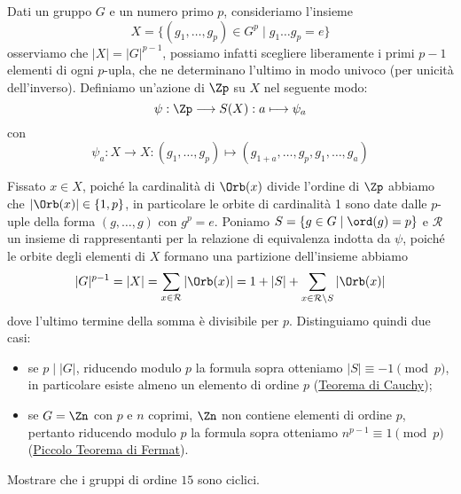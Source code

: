 \documentclass[11pt]{scrartcl}
\begin{document}
Dati un gruppo $G$ e un numero primo $p$, consideriamo l'insieme 
\[
    X = \{(g_1, \ldots, g_p) \in G^p\mid g_1\ldots g_p = e\}
\]osserviamo che $|X| = |G|^{p - 1}$, possiamo infatti scegliere liberamente
i primi $p - 1$ elementi di ogni $p$-upla, che ne determinano l'ultimo in 
modo univoco (per unicità dell'inverso). Definiamo un'azione di $\Zp$ su $X$
nel seguente modo:
\[
    \psi: \Zp \longrightarrow S(X) : a \longmapsto \psi_a
\]
con
\[
    \psi_a:X\longrightarrow X : (g_1, \ldots, g_p)\longmapsto (g_{1 + a}, \ldots, g_p, g_1, \ldots, g_a)
\]

Fissato $x \in X$, poiché la cardinalità di $\Orb(x)$ divide l'ordine di $\Zp$
abbiamo che $|\Orb(x)| \in \{1, p\}$, in particolare le orbite di cardinalità
1 sono date dalle $p$-uple della forma $(g, \ldots, g)$ con $g^p = e$.
Poniamo $S = \{g\in G \mid \ord(g) = p\}$ e $\mathcal{R}$ un insieme di 
rappresentanti per la relazione di equivalenza indotta da $\psi$, poiché 
le orbite degli elementi di $X$ formano una partizione dell'insieme abbiamo
\[
    |G|^{p - 1} = |X| = \sum_{x \in \mathcal{R}} |\Orb(x)| = 1 + |S| + \sum_{x \in \mathcal{R}\setminus S}|\Orb(x)|
\]dove l'ultimo termine della somma è divisibile per $p$. Distinguiamo 
quindi due casi:
\begin{itemize}
    \item se $p\mid |G|$, riducendo modulo $p$ la formula sopra otteniamo
    $|S| \equiv -1 \pmod p$, in particolare esiste almeno un elemento di
    ordine $p$ (\hyperref[teorema1.44]{Teorema di Cauchy});
    \item se $G = \Zn$ con $p$ e $n$ coprimi, $\Zn$ non contiene elementi
    di ordine $p$, pertanto riducendo modulo $p$ la formula sopra otteniamo
    $n^{p - 1} \equiv 1 \pmod p$ (\hyperref[teorema1.45]{Piccolo Teorema di Fermat}).
\end{itemize}

\begin{exercise}
    Mostrare che i gruppi di ordine $15$ sono ciclici.
\end{exercise}
\end{document}

